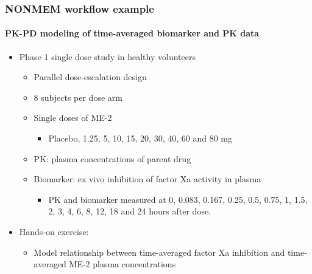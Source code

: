 \documentclass{beamer}
\begin{document}
\begin{frame}
  \frametitle{NONMEM workflow example}
  \framesubtitle{\large PK-PD modeling of time-averaged biomarker and
    PK data}
  
  \begin{itemize}
  \item Phase 1 single dose study in healthy volunteers
    \begin{itemize}
    \item Parallel dose-escalation design
    \item 8 subjects per dose arm
    \item Single doses of ME-2
      \begin{itemize}
      \item Placebo, 1.25, 5, 10, 15, 20, 30, 40, 60 and 80 mg
      \end{itemize}
    \item PK: plasma concentrations of parent drug
    \item Biomarker: ex vivo inhibition of factor Xa activity in
      plasma
      \begin{itemize}
      \item PK and biomarker measured at 0, 0.083, 0.167, 0.25, 0.5,
        0.75, 1, 1.5, 2, 3, 4, 6, 8, 12, 18 and 24 hours after dose.
      \end{itemize}
    \end{itemize}
  \item Hands-on exercise:
    \begin{itemize}
    \item Model relationship between time-averaged factor Xa
      inhibition and time-averaged ME-2 plasma concentrations
    \end{itemize}
  \end{itemize}

\end{frame}
\end{document}
